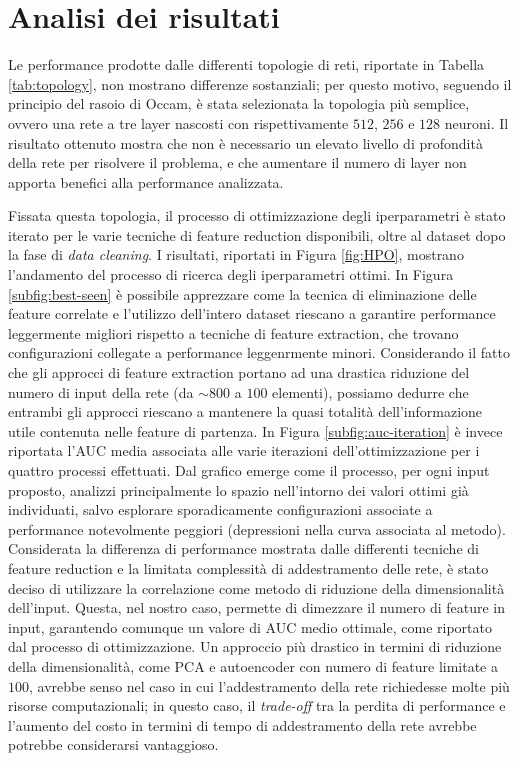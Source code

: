 \section{Analisi dei risultati}
Le performance prodotte dalle differenti topologie di reti, riportate in Tabella \ref{tab:topology}, non mostrano differenze sostanziali; per questo motivo, seguendo il principio del rasoio di Occam, è stata selezionata la topologia più semplice, ovvero una rete a tre layer nascosti con rispettivamente $512$, $256$ e $128$ neuroni. 
Il risultato ottenuto mostra che non è necessario un elevato livello di profondità della rete per risolvere il problema, e che aumentare il numero di layer non apporta benefici alla performance analizzata.

Fissata questa topologia, il processo di ottimizzazione degli iperparametri è stato iterato per le varie tecniche di feature reduction disponibili, oltre al dataset dopo la fase di \textit{data cleaning}. 
I risultati, riportati in Figura \ref{fig:HPO}, mostrano l'andamento del processo di ricerca degli iperparametri ottimi. 
In Figura \ref{subfig:best-seen} è possibile apprezzare come la tecnica di eliminazione delle feature correlate e l'utilizzo dell'intero dataset riescano a garantire performance leggermente migliori rispetto a tecniche di feature extraction, che trovano configurazioni collegate a performance leggenrmente minori. 
Considerando il fatto che gli approcci di feature extraction portano ad una drastica riduzione del numero di input della rete (da $\sim800$ a $100$ elementi), possiamo dedurre che entrambi gli approcci riescano a mantenere la quasi totalità dell'informazione utile contenuta nelle feature di partenza. 
In Figura \ref{subfig:auc-iteration} è invece riportata l'AUC media associata alle varie iterazioni dell'ottimizzazione per i quattro processi effettuati. 
Dal grafico emerge come il processo, per ogni input proposto, analizzi principalmente lo spazio nell'intorno dei valori ottimi già individuati, salvo esplorare sporadicamente configurazioni associate a performance notevolmente peggiori (depressioni nella curva associata al metodo).\\
Considerata la differenza di performance mostrata dalle differenti tecniche di feature reduction e la limitata complessità di addestramento delle rete, è stato deciso di utilizzare la correlazione come metodo di riduzione della dimensionalità dell'input. 
Questa, nel nostro caso, permette di dimezzare il numero di feature in input, garantendo comunque un valore di AUC medio ottimale, come riportato dal processo di ottimizzazione. 
Un approccio più drastico in termini di riduzione della dimensionalità, come PCA e autoencoder con numero di feature limitate a $100$, avrebbe senso nel caso in cui l'addestramento della rete richiedesse molte più risorse computazionali; in questo caso, il \textit{trade-off} tra la perdita di performance e l'aumento del costo in termini di tempo di addestramento della rete avrebbe potrebbe considerarsi vantaggioso.

